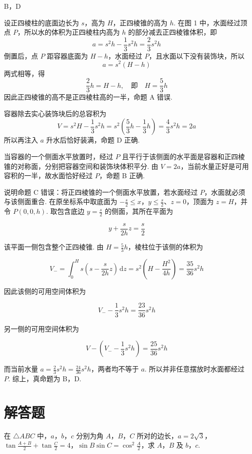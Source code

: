 \begin{answer}
B，D
\end{answer}

\begin{solution}
设正四棱柱的底面边长为 \(s\)，高为 \(H\)，正四棱锥的高为 \(h\). 在图 1 中，水面经过顶点 \(P\)，所以水的体积为正四棱柱内高为 \(h\) 的部分减去正四棱锥体积，即
\[
a=s^2h-\frac13s^2h=\frac23s^2h
\]
倒置后，点 \(P\) 距容器底面为 \(H-h\)，水面经过 \(P\)，且水面以下没有装饰块，所以
\[
a=s^2(H-h)
\]
两式相等，得
\[
\frac23h=H-h,\quad\text{即}\quad H=\frac53h
\]
因此正四棱锥的高不是正四棱柱高的一半，命题 A 错误.

容器除去实心装饰块后的总容积为
\[
V=s^2H-\frac13s^2h
=s^2\left(\frac53h-\frac13h\right)
=\frac43s^2h=2a
\]
所以再注入 \(a\) 升水后恰好装满，命题 D 正确.

当容器的一个侧面水平放置时，经过 \(P\) 且平行于该侧面的水平面是容器和正四棱锥的对称面，分别把容器空间和装饰块体积平分. 由 \(V=2a\)，当前水量正好是可用容积的一半，故水面恰好经过 \(P\)，命题 B 正确.

说明命题 C 错误：将正四棱锥的一个侧面水平放置，若水面经过 \(P\)，水面就必须与该侧面重合. 在原坐标系中取底面为
\(-\frac{s}{2}\leqslant x\)，\(y\leqslant\frac{s}{2}\)、\(z=0\)，顶面为 \(z=H\)，并令 \(P\left(0,0,h\right)\). 取包含底边 \(y=\frac{s}{2}\) 的侧面，其所在平面为

\[
y+\frac{s}{2h}z=\frac{s}{2}
\]

该平面一侧包含整个正四棱锥. 由 \(H=\frac53h\)，棱柱位于该侧的体积为

\[
V_-=\int_0^H s\left(s-\frac{s}{2h}z\right)\,\mathrm dz
=s^2\left(H-\frac{H^2}{4h}\right)=\frac{35}{36}s^2h
\]

因此该侧的可用空间体积为

\[
V_--\frac13s^2h=\frac{23}{36}s^2h
\]

另一侧的可用空间体积为

\[
V-\left(V_--\frac13s^2h\right)=\frac{25}{36}s^2h
\]

而当前水量 \(a=\frac23s^2h=\frac{24}{36}s^2h\)，两者均不等于 \(a\). 所以并非任意摆放时水面都经过 \(P\). 综上，真命题为 B，D.
\end{solution}

\section{解答题}

\begin{problem}
在 \(\triangle ABC\) 中，\(a\)，\(b\)，\(c\) 分别为角 \(A\)，\(B\)，\(C\) 所对的边长，\(a = 2\sqrt{3}\)，\(\tan \frac{A + B}{2} + \tan \frac{C}{2} = 4\)，\(\sin B \sin C = \cos^2 \frac{A}{2}\)，求 \(A\)，\(B\) 及 \(b\)，\(c\).
\end{problem}

